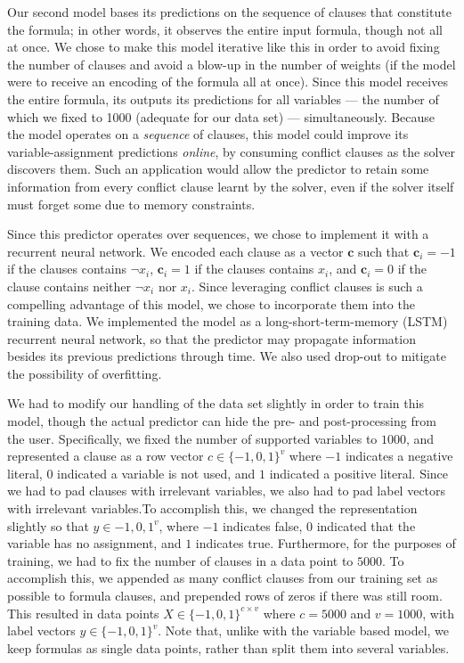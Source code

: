 \documentclass{article}
\begin{document}
Our second model bases its predictions on the sequence of clauses that
constitute the formula; in other words, it observes the entire input formula,
though not all at once. We chose to make this model iterative like this in order
to avoid fixing the number of clauses and avoid a blow-up in the number of
weights (if the model were to receive an encoding of the formula all at once).
Since this model receives the entire formula, its outputs its predictions for all
variables --- the number of which we fixed to 1000 (adequate for our data set)
--- simultaneously. Because the model operates on a \emph{sequence} of clauses,
this model could improve its variable-assignment predictions \emph{online}, by
consuming conflict clauses as the solver discovers them. Such an application
would allow the predictor to retain some information from every conflict
clause learnt by the solver, even if the solver itself must forget some due to
memory constraints.

Since this predictor operates over sequences, we chose to implement it with a
recurrent neural network. We encoded each clause as a vector $\mathbf{c}$ such that
$\mathbf{c}_i = -1$ if the clauses contains $\neg x_i$, $\mathbf{c}_i = 1$ if the
clauses contains $x_i$, and $\mathbf{c}_i = 0$ if the clause contains neither $\neg
x_i$ nor $x_i$. Since leveraging conflict clauses is such a compelling advantage
of this model, we chose to incorporate them into the training data. We
implemented the model as a long-short-term-memory (LSTM) recurrent neural network,
so that the predictor may propagate information besides its previous predictions
through time. We also used drop-out to mitigate the possibility of overfitting.

We had to modify our handling of the data set slightly in order to train this
model, though the actual predictor can hide the pre- and post-processing from
the user. Specifically, we fixed the number of supported variables to $1000$,
and represented a clause as a row vector $c \in \{-1, 0, 1\}^v$ where $-1$
indicates a negative literal, $0$ indicated a variable is not used, and $1$
indicated a positive literal. Since we had to pad clauses with irrelevant
variables, we also had to pad label vectors with irrelevant variables.To
accomplish this, we changed the representation slightly so that $y \in {-1, 0,
1}^v$, where $-1$ indicates false, $0$ indicated that the variable has no
assignment, and $1$ indicates true. Furthermore, for the purposes of training,
we had to fix the number of clauses in a data point to $5000$. To accomplish
this, we appended as many conflict clauses from our training set as possible to
formula clauses, and prepended rows of zeros if there was still room. This
resulted in data points $X \in \{-1, 0, 1\}^{c \times v}$ where $c = 5000$ and
$v = 1000$, with label vectors $y \in \{-1, 0, 1\}^v$. Note that, unlike with
the variable based model, we keep formulas as single data points, rather than
split them into several variables.
\end{document}
